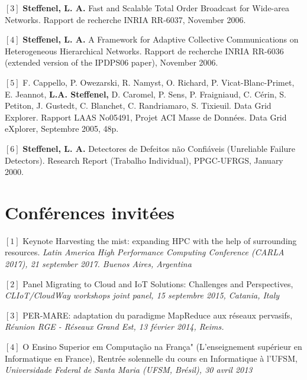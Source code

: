 \documentclass[final,twoside]{hdr} %
\begin{document}
\vspace{1em} \noindent $[3]$
\textbf{Steffenel, L. A.} {Fast and Scalable Total Order Broadcast for Wide-area Networks}. Rapport de recherche INRIA RR-6037, November 2006. 

\vspace{1em} \noindent $[4]$
\textbf{Steffenel, L. A.} {A Framework for Adaptive Collective Communications on Heterogeneous Hierarchical Networks}. Rapport de recherche INRIA RR-6036 (extended version of the IPDPS06 paper), November 2006.

\vspace{1em} \noindent $[5]$
F. Cappello, P. Owezarski, R. Namyst, O. Richard, P. Vicat-Blanc-Primet, E. Jeannot, \textbf{L.A. Steffenel,} D. Caromel, P. Sens, P. Fraigniaud, C. Cérin, S. Petiton, J. Gustedt, C. Blanchet, C. Randriamaro, S. Tixieuil. {Data Grid Explorer}. Rapport LAAS No05491, Projet ACI Masse de Données. Data Grid eXplorer, Septembre 2005, 48p. 

\vspace{1em} \noindent $[6]$
\textbf{Steffenel, L. A.} {Detectores de Defeitos não Confiáveis} (Unreliable Failure Detectors). Research Report (Trabalho Individual), PPGC-UFRGS, January 2000. 




\section*{Conférences invitées}

\noindent $[1]$ Keynote {Harvesting the mist: expanding HPC with the help of surrounding resources}. \em{Latin America High Performance Computing Conference (CARLA 2017)}, 21 september 2017. Buenos Aires, Argentina

\vspace{1em} \noindent $[2]$ Panel {Migrating to Cloud and IoT Solutions: Challenges and Perspectives}, \em{CLIoT/CloudWay workshops joint panel}, 15 septembre 2015, Catania, Italy

\vspace{1em} \noindent $[3]$ {PER-MARE: adaptation du paradigme MapReduce aux réseaux pervasifs}, \em{Réunion RGE - Réseaux Grand Est}, 13 février 2014, Reims.

\vspace{1em} \noindent $[4]$ {O Ensino Superior em Computação na França" (L'enseignement supérieur en Informatique en France)}, Rentrée solennelle du cours en Informatique à l'UFSM, \em{Universidade Federal de Santa Maria (UFSM, Brésil)}, 30 avril 2013
\end{document}

